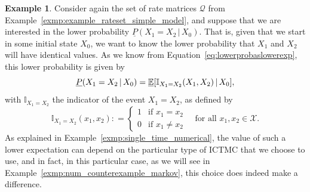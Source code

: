\documentclass[10pt,a4paper]{paper}
\theoremstyle{definition}
\newtheorem{exmp}{Example}%
\newcommand{\states}{\mathcal{X}}
\newcommand{\ind}[1]{\mathbb{I}_{#1}}
\newcommand{\rateset}{\mathcal{Q}}
\newcommand{\coloneqq}{:\!=}
\newcommand{\ictmc}{{ICTMC}}
\begin{document}
\begin{exmp}\label{exmp:num_multivar_func_nonmarkov}
Consider again the set of rate matrices $\rateset$ from Example~\ref{exmp:example_rateset_simple_model}, and suppose that we are interested in the lower probability $\underline{P}(X_1 = X_2\,\vert\, X_0)$. That is, given that we start in some initial state $X_0$, we want to know the lower probability that $X_1$ and $X_2$ will have identical values. %
As we know from Equation~\eqref{eq:lowerprobaslowerexp}, this lower probability is given by
\begin{equation*}
\underline{P}(X_1 = X_2\,\vert\, X_0) = \underline{\mathbb{E}}[
\ind{X_1=X_2}(X_1,X_2)\,\vert\,X_0],\vspace{4pt}
\end{equation*}
with $\ind{X_1=X_2}$ the indicator of the event $X_1=X_2$, as defined by
\begin{equation*}
\ind{X_1=X_2}(x_1,x_2) \coloneqq
\begin{cases}
1 & \text{if $x_1 = x_2$} \\
0 & \text{if $x_1 \neq x_2$}
\end{cases}
~~~\text{ for all $x_1,x_2\in\states$.}
\end{equation*}
As explained in Example~\ref{exmp:single_time_numerical}, the value of such a lower expectation can depend on the particular type of {\ictmc} that we choose to use, and in fact, in this particular case, as we will see in Example~\ref{exmp:num_counterexample_markov}, this choice does indeed make a difference. 


\end{exmp}
\end{document}
